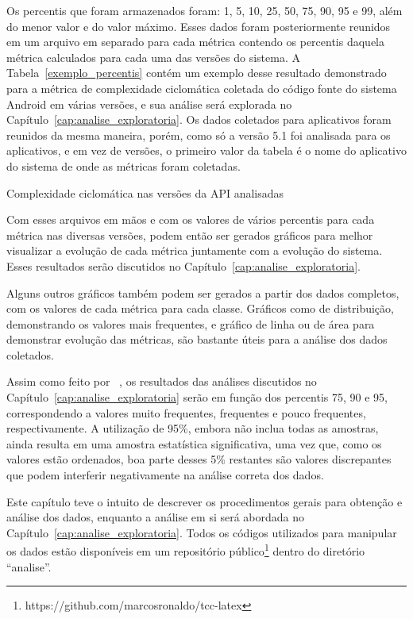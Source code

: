 Os percentis que foram armazenados foram: 1, 5, 10, 25, 50, 75, 90, 95 e 99, além do menor valor e do valor máximo. Esses dados foram posteriormente reunidos em um arquivo em separado para cada métrica contendo os percentis daquela métrica calculados para cada uma das versões do sistema. A Tabela~\ref{exemplo_percentis} contém um exemplo desse resultado demonstrado para a métrica de complexidade ciclomática coletada do código fonte do sistema Android em várias versões, e sua análise será explorada no Capítulo~\ref{cap:analise_exploratoria}. Os dados coletados para aplicativos foram reunidos da mesma maneira, porém, como só a versão 5.1 foi analisada para os aplicativos, e em vez de versões, o primeiro valor da tabela é o nome do aplicativo do sistema de onde as métricas foram coletadas.

\begin{table}[!htb]
\centering
{}

\caption{Complexidade ciclomática nas versões da API analisadas}
\label{exemplo_percentis}
\end{table} 

Com esses arquivos em mãos e com os valores de vários percentis para cada métrica nas diversas versões, podem então ser gerados gráficos para melhor visualizar a evolução de cada métrica juntamente com a evolução do sistema. Esses resultados serão discutidos no Capítulo~\ref{cap:analise_exploratoria}.

Alguns outros gráficos também podem ser gerados a partir dos dados completos, com os valores de cada métrica para cada classe. Gráficos como de distribuição, demonstrando os valores mais frequentes, e gráfico de linha ou de área para demonstrar evolução das métricas, são bastante úteis para a análise dos dados coletados. 

Assim como feito por ~, os resultados das análises discutidos no Capítulo~\ref{cap:analise_exploratoria} serão em função dos percentis 75, 90 e 95, correspondendo a valores muito frequentes, frequentes e pouco frequentes, respectivamente. A utilização de 95\%, embora não inclua todas as amostras, ainda resulta em uma amostra estatística significativa, uma vez que, como os valores estão ordenados, boa parte desses 5\% restantes são valores discrepantes que podem interferir negativamente na análise correta dos dados.

Este capítulo teve o intuito de descrever os procedimentos gerais para obtenção e análise dos dados, enquanto a análise em si será abordada no Capítulo~\ref{cap:analise_exploratoria}. Todos os códigos utilizados para manipular os dados estão disponíveis em um repositório público\footnote{https://github.com/marcosronaldo/tcc-latex} dentro do diretório ``analise''.

